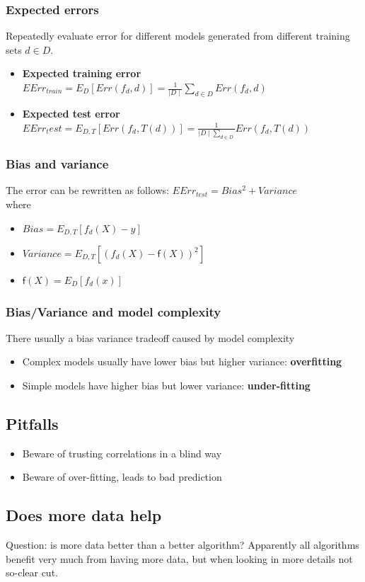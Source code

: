 \subsubsection{Expected errors}
Repeatedly evaluate error for different models generated from
different training sets $ d \in D $.
\begin{itemize}
\item \textbf{Expected training error} \\
  $ EErr_{train} = E_D[Err(f_d, d)] = \frac{1}{\mid D \mid} \sum_{d
    \in D} Err(f_d, d) $
\item \textbf{Expected test error} \\
  $EErr_test = E_{D,T} [Err(f_d, T(d))] = \frac{1}{\mid D \mid \sum_{d
    \in D}} Err(f_d, T(d)) $
\end{itemize}

\subsubsection{Bias and variance}
The error can be rewritten as follows:
$ EErr_{test} = Bias^2 + Variance $ \\ where
\begin{itemize}
\item $ Bias = E_{D,T} [f_d(X) - y] $
\item $ Variance = E_{D, T} [(f_d(X) - \mathsf{f}(X))^2] $
\item $ \mathsf{f}(X) = E_{D}[f_d(x)] $
\end{itemize}

\subsubsection{Bias/Variance and model complexity}
There usually a bias variance tradeoff caused by model complexity
\begin{itemize}
\item Complex models usually have lower bias but higher variance:
  \textbf{overfitting}
\item Simple models have higher bias but lower variance:
  \textbf{under-fitting}
\end{itemize}

\subsection{Pitfalls}
\begin{itemize}
\item Beware of trusting correlations in a blind way
\item Beware of over-fitting, leads to bad prediction
\end{itemize}

\subsection{Does more data help}
Question: is more data better than a better algorithm?
Apparently all algorithms benefit very much from having more data, but
when looking in more details not so-clear cut.

